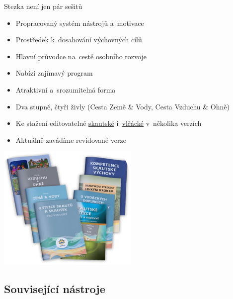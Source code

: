 \documentclass[compress, ucs, xelatex, 11pt, xcolor=dvipsnames, print, aspectratio=169,
	hyperref={
		bookmarks=true,
		unicode=true,
		colorlinks=true,
		pdftitle={Skautska vychovna metoda},
		plainpages=false,
		pdfauthor={Vojtech Zeisek},
		pdfsubject={Skautska vychovna metoda a jeji vyvoj za posledni stoleti a desetileti},
		pdfcreator={XeLaTeX},
		pdfkeywords={Junak, Pedagogika, Skaut, Skauting, Vychovna metoda},
		linkcolor=Red, %
		anchorcolor=ForestGreen, %
		citecolor=ForestGreen, %
		filecolor=ForestGreen, %
		menucolor=ForestGreen, %
		urlcolor=Sepia, %
		pdftex},
	url={hyphens, lowtilde} %
	]{beamer}
\begin{document}
\begin{frame}{Stezka není jen pár sešitů}
	\begin{multicols}{2}
		\begin{itemize}
			\item Propracovaný systém nástrojů a~motivace
			\item Prostředek k~dosahování výchovných cílů
			\item Hlavní průvodce na~cestě osobního rozvoje
			\item Nabízí zajímavý program
			\item Atraktivní a~srozumitelná forma
			\item Dva stupně, čtyři živly (Cesta Země \& Vody, Cesta Vzduchu \& Ohně)
			\item Ke stažení editovatelné \href{https://krizovatka.skaut.cz/oddil/program/skautky-a-skauti/skauti-skautky-stezky}{skautské} i~\href{https://krizovatka.skaut.cz/oddil/program/svetlusky-a-vlcata/vlcata-svetlusky-stezky}{vlčácké} v~několika verzích
			\item Aktuálně zavádíme revidované verze
		\end{itemize}
		\columnbreak
		\begin{center}
			\includegraphics[height=6cm]{stezky.png}
		\end{center}
	\end{multicols}
\end{frame}

\subsection{Související nástroje}
\end{document}
